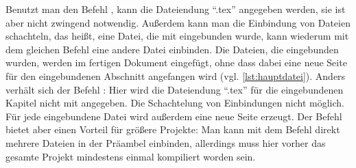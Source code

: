  Benutzt man den Befehl \texttt{}, kann die Dateiendung \enquote{.tex} angegeben werden, sie ist aber nicht zwingend notwendig. Außerdem kann man die Einbindung von Dateien schachteln, das heißt, eine Datei, die mit \texttt{} eingebunden wurde, kann wiederum mit dem gleichen Befehl eine andere Datei einbinden. Die Dateien, die eingebunden wurden, werden im fertigen Dokument eingefügt, ohne dass dabei eine neue Seite für den eingebundenen Abschnitt angefangen wird (vgl. \cref{lst:hauptdatei}). Anders verhält sich der Befehl \texttt{}: Hier wird die Dateiendung \enquote{.tex} für die eingebundenen Kapitel nicht mit angegeben. Die Schachtelung von Einbindungen nicht möglich. Für jede eingebundene Datei wird außerdem eine neue Seite erzeugt. Der \texttt{} Befehl bietet aber einen Vorteil für größere Projekte: Man kann mit dem Befehl \texttt{} direkt mehrere Dateien in der Präambel einbinden, allerdings muss hier vorher das gesamte Projekt mindestens einmal kompiliert worden sein. 
